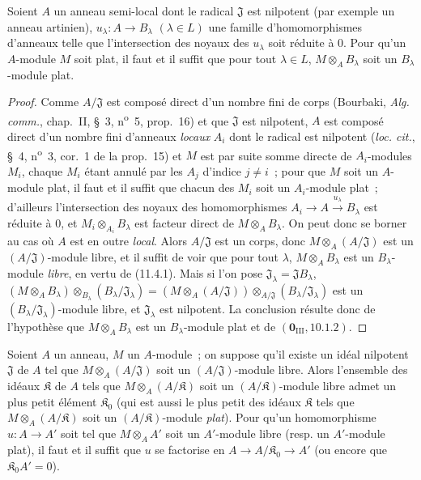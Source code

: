 \begin{corollary}[11.4.3]
\label{IV.11.4.3-fr}
Soient $A$ un anneau semi-local dont le radical $\mathfrak J$ est nilpotent
(par exemple un anneau artinien), $u_\lambda:A\to B_\lambda$ $(\lambda\in L)$
une famille d'homomorphismes d'anneaux telle que l'intersection des noyaux des
$u_\lambda$ soit réduite à $0$. Pour qu'un $A$-module $M$ soit plat, il faut et
il suffit que pour tout $\lambda\in L$, $M\otimes_A B_\lambda$ soit un
$B_\lambda$-module plat.
\end{corollary}

\begin{proof}
Comme $A/\mathfrak J$ est composé direct d'un nombre fini de corps (Bourbaki,
\emph{Alg. comm.}, chap.~II, \S~3, n\textsuperscript{o}~5, prop.~16) et que $\mathfrak J$
est nilpotent, $A$ est composé direct d'un nombre fini d'anneaux \emph{locaux} $A_i$
dont le radical est nilpotent (\emph{loc. cit.}, \S~4, n\textsuperscript{o}~3, cor.~1 de
la prop.~15) et $M$ est par suite somme directe de $A_i$-modules $M_i$, chaque
$M_i$ étant annulé par les $A_j$ d'indice $j\neq i$~; pour que $M$ soit un
$A$-module plat, il faut et il suffit que chacun des $M_i$ soit un $A_i$-module
plat~; d'ailleurs l'intersection des noyaux des homomorphismes
$A_i\longrightarrow A\xrightarrow{u_\lambda}B_\lambda$
est réduite à $0$, et $M_i\otimes_{A_i}B_\lambda$ est facteur direct de
$M\otimes_A B_\lambda$. On peut donc se borner au cas où $A$ est en outre
\emph{local}. Alors $A/\mathfrak J$ est un corps, donc
$M\otimes_A(A/\mathfrak J)$ est un $(A/\mathfrak J)$-module libre, et il
suffit de voir que pour tout $\lambda$, $M\otimes_A B_\lambda$ est un
$B_\lambda$-module \emph{libre}, en vertu de (11.4.1). Mais si l'on pose
$\mathfrak J_\lambda=\mathfrak JB_\lambda$,
$(M\otimes_A B_\lambda)\otimes_{B_\lambda}(B_\lambda/\mathfrak J_\lambda)
=(M\otimes_A(A/\mathfrak J))\otimes_{A/\mathfrak J}
 (B_\lambda/\mathfrak J_\lambda)$
est un $(B_\lambda/\mathfrak J_\lambda)$-module libre, et
$\mathfrak J_\lambda$ est nilpotent. La conclusion résulte donc de l'hypothèse
que $M\otimes_A B_\lambda$ est un $B_\lambda$-module plat et de
$(\mathbf 0_{\mathrm{III}},10.1.2)$.
\end{proof}

\begin{corollary}[11.4.4]
\label{IV.11.4.4-fr}
Soient $A$ un anneau, $M$ un $A$-module~; on suppose qu'il existe un idéal
nilpotent $\mathfrak J$ de $A$ tel que $M\otimes_A(A/\mathfrak J)$ soit un
$(A/\mathfrak J)$-module libre. Alors l'ensemble des idéaux $\mathfrak K$ de
$A$ tels que $M\otimes_A(A/\mathfrak K)$ soit un $(A/\mathfrak K)$-module
libre admet un plus petit élément $\mathfrak K_0$ \textup{(qui est aussi le plus petit
des idéaux $\mathfrak K$ tels que $M\otimes_A(A/\mathfrak K)$ soit un
$(A/\mathfrak K)$-module \emph{plat})}.
Pour qu'un homomorphisme $u:A\to A'$ soit tel que $M\otimes_A A'$ soit un
$A'$-module libre \textup{(resp.} un $A'$-module plat), il faut et il suffit que $u$ se
factorise en $A\to A/\mathfrak K_0\to A'$ \textup{(ou encore que
$\mathfrak K_0A'=0$)}.
\end{corollary}

